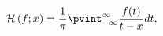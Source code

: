 \[\mathop{\mathcal{H}\/}\nolimits\left(f;x\right)=\frac{1}{\pi}\pvint_{-\infty}^%
{\infty}\frac{f(t)}{t-x}dt,\]